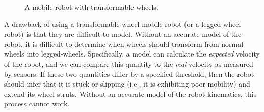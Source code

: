\begin{figure}[!ht]
    \centering

    \quad

    \vspace{-0.1in}

    \caption{A mobile robot with transformable wheels.}
    \label{fig:robot}

    \vspace{-0.15in}

\end{figure}

A drawback of using a transformable wheel mobile robot (or a legged-wheel robot) is that they are difficult to model.
%
Without an accurate model of the robot, it is difficult to determine when wheels should transform from normal wheels into legged-wheels.
%
Specifically, a model can calculate the \emph{expected} velocity of the robot, and we can compare this quantity to the \emph{real} velocity as measured by sensors. If these two quantities differ by a specified threshold, then the robot should infer that it is stuck or slipping (i.e., it is exhibiting poor mobility) and extend its wheel struts.
%
Without an accurate model of the robot kinematics, this process cannot work.


